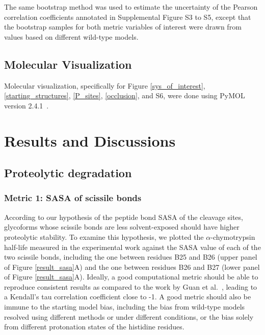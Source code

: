 \documentclass[sn-vancouver]{sn-jnl}
\begin{document}
The same bootstrap method was used to estimate the uncertainty of the Pearson correlation coefficients annotated in Supplemental Figure S3 to S5, except that the bootstrap samples for both metric variables of interest were drawn from values based on different wild-type models.

\subsection{Molecular Visualization}
Molecular visualization, specifically for Figure \ref{sys_of_interest}, \ref{starting_structures}, \ref{P_sites}, \ref{occlusion}, and S6, were done using PyMOL version 2.4.1~\cite{delano2002pymol}.

\section{Results and Discussions}\label{results}
\subsection{Proteolytic degradation}
\subsubsection*{Metric 1: SASA of scissile bonds}
According to our hypothesis of the peptide bond SASA of the cleavage sites, glycoforms whose scissile bonds are less solvent-exposed should have higher proteolytic stability. To examine this hypothesis, we plotted the $\alpha$-chymotrypsin half-life measured in the experimental work against the SASA value of each of the two scissile bonds, including the one between residues B25 and B26 (upper panel of Figure \ref{result_sasa}A) and the one between residues B26 and B27 (lower panel of Figure \ref{result_sasa}A). Ideally, a good computational metric should be able to reproduce consistent results as compared to the work by Guan et al.~\cite{guan2018chemically}, leading to a Kendall's tau correlation coefficient close to -1. A good metric should also be immune to the starting model bias, including the bias from wild-type models resolved using different methods or under different conditions, or the bias solely from different protonation states of the histidine residues. 
\end{document}

